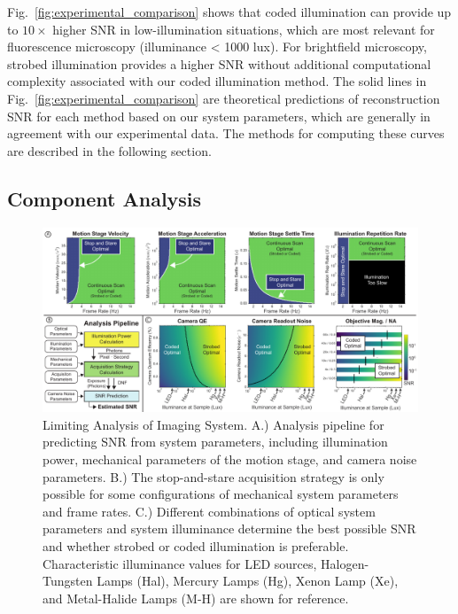 Fig.~\ref{fig:experimental_comparison} shows that coded illumination can provide up to $10\times$ higher SNR in low-illumination situations, which are most relevant for fluorescence microscopy (illuminance < 1000 lux). For brightfield microscopy, strobed illumination provides a higher SNR without additional computational complexity associated with our coded illumination method. The solid lines in Fig.~\ref{fig:experimental_comparison} are theoretical predictions of reconstruction SNR for each method based on our system parameters, which are generally in agreement with our experimental data. The methods for computing these curves are described in the following section.

\subsection{Component Analysis}\label{sec:component_analysis}

\begin{figure}
  \centering
    \includegraphics[width=1.0\textwidth]{figures/fig_highthroughput_component_analysis.pdf}
      \caption{\label{fig:component_analysis} Limiting Analysis of Imaging System. A.) Analysis pipeline for predicting SNR from system parameters, including illumination power, mechanical parameters of the motion stage, and camera noise parameters. B.) The stop-and-stare acquisition strategy is only possible for some configurations of mechanical system parameters and frame rates. C.) Different combinations of optical system parameters and system illuminance determine the best possible SNR and whether strobed or coded illumination is preferable. Characteristic illuminance values for LED sources, Halogen-Tungsten Lamps (Hal), Mercury Lamps (Hg), Xenon Lamp (Xe), and Metal-Halide Lamps (M-H) are shown for reference. }
\end{figure}

